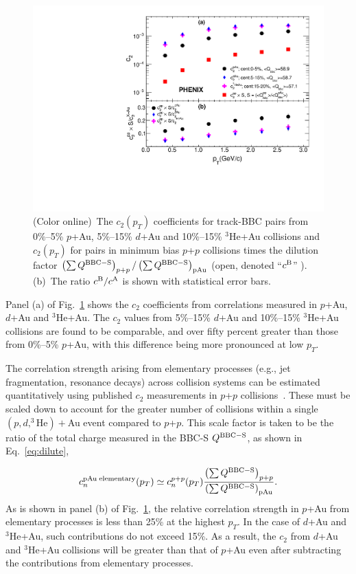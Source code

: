 \documentclass[%
reprint,
showpacs,preprintnumbers,
 amsmath,amssymb,
 aps,
]{revtex4-1}
\newcommand{\pt}{\mbox{$p_T$}\xspace}
\newcommand{\dau}{\mbox{$d$+Au}\xspace}
\newcommand{\pau}{\mbox{$p$+Au}\xspace}
\newcommand{\hau}{\mbox{$^3\text{He}$+Au}\xspace}
\newcommand{\pp}{\mbox{$p$+$p$}\xspace}
\begin{document}
\begin{figure}[htbp]
  \includegraphics[scale=0.45]{Figures/figure2.pdf}
  \caption{(Color online)~The $c_2(p_T)$ coefficients for track-BBC pairs from 
0\%--5\% \pau, 5\%--15\% \dau and 10\%--15\% \hau collisions and
$c_{2}(p_{T})$ for pairs in minimum bias \pp collisions times the dilution
factor $\left( \sum Q^{{\rm BBC-S}} \right)_{p+p} / \left( \sum Q^{{\rm
BBC-S}} \right)_{{\rm pAu}}$ (open, denoted ``$c^{{\rm B}}$'' ). (b)~The
ratio $c^{{\rm B}}/c^{{\rm A}}$ is shown with statistical error bars.
}
\label{fig:figure2}
\end{figure}

Panel (a) of Fig.~\ref{fig:figure2} shows the $c_{2}$ coefficients from correlations measured in \pau, \dau and \hau. The $c_2$ values from 5\%--15\% \dau and 10\%--15\% \hau collisions are found to be comparable, and over fifty percent greater than those from 0\%--5\% \pau, with this difference being more pronounced at low \pt.

The correlation strength arising from elementary processes (e.g., jet fragmentation, resonance decays) across collision systems can be estimated quantitatively using published $c_{2}$ measurements in \pp collisions~\cite{PhysRevLett.115.142301}. These must be scaled down to account for the greater number of collisions within a single $(p,d,^{3}\text{He})+$Au event compared to \pp. This scale factor is taken to be the ratio of the total charge measured in the BBC-S $Q^{{\rm BBC-S}}$, as shown in Eq.~\ref{eq:dilute},

\begin{equation}
c_{n}^{{\rm pAu \; elementary}}(p_{T}) \simeq c_{n}^{p+p}(p_{T})
\frac{\left( \sum Q^{{\rm BBC-S}} \right)_{p+p}}
{\left( \sum Q^{{\rm BBC-S}} \right)_{{\rm pAu}}
}.
\label{eq:dilute}
\end{equation}
As is shown in panel (b) of Fig.~\ref{fig:figure2}, the relative
correlation strength in \pau from elementary processes is less than 25\%
at the highest \pt. In the case of \dau and \hau, such contributions
do not exceed 15\%. As a result, the $c_2$ from \dau and \hau collisions will be greater than that of \pau
even after subtracting the contributions from elementary processes.
\end{document}
